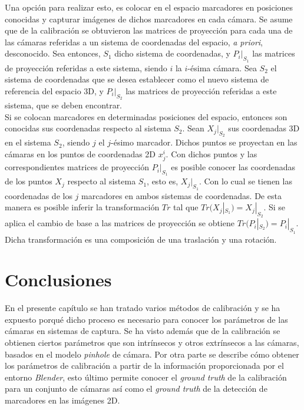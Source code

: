 Una opción para realizar esto, es colocar en el espacio marcadores en posiciones conocidas y capturar imágenes de dichos marcadores en cada cámara. Se asume que de la calibración se obtuvieron las matrices de proyección para cada una de las cámaras referidas a un sistema de coordenadas del espacio, \textit{a priori}, desconocido. Sea entonces, $S_1$ dicho sistema de coordenadas, y $P_i|_{S_1}$ las matrices de proyección referidas a este sistema, siendo $i$ la $i$-ésima cámara. Sea $S_2$ el sistema de coordenadas que se desea establecer como el nuevo sistema de referencia del espacio 3D, y $P_i|_{S_2}$ las matrices de proyección referidas a este sistema, que se deben encontrar.\\

Si se colocan marcadores en determinadas posiciones del espacio, entonces son conocidas sus coordenadas respecto al sistema $S_2$. Sean $X_j|_{S_2}$ sus coordenadas 3D en el sistema $S_2$, siendo $j$ el $j$-ésimo marcador. Dichos puntos se proyectan en las cámaras en los puntos de coordenadas 2D $x_j^i$. Con dichos puntos y las correspondientes matrices de proyección $P_i|_{S_1}$ es posible conocer las coordenadas de los puntos $X_j$ respecto al sistema $S_1$, esto es, $X_j|_{S_1}$. Con lo cual se tienen las coordenadas de los $j$ marcadores en ambos sistemas de coordenadas. De esta manera es posible inferir la transformación $Tr$ tal que $Tr(X_j|_{S_1}) = X_j|_{S_2}$. Si se aplica el cambio de base a las matrices de proyección se obtiene $Tr(P_i|_{S_2}) = P_i|_{S_1} $. Dicha transformación es una composición de una traslación y una rotación.


\section{Conclusiones}

En el presente capítulo se han tratado varios métodos de calibración y se ha expuesto porqué dicho proceso es necesario para conocer los parámetros de las cámaras en sistemas de captura. Se ha visto además que de la calibración se obtienen ciertos parámetros que son intrínsecos y otros extrínsecos a las cámaras, basados en el modelo \textit{pinhole} de cámara. Por otra parte se describe cómo obtener los parámetros de calibración a partir de la información proporcionada por el entorno \emph{Blender}, esto último permite conocer el \textit{ground truth} de la calibración para un conjunto de cámaras así como el \textit{ground truth} de la detección de marcadores en las imágenes 2D.\\

